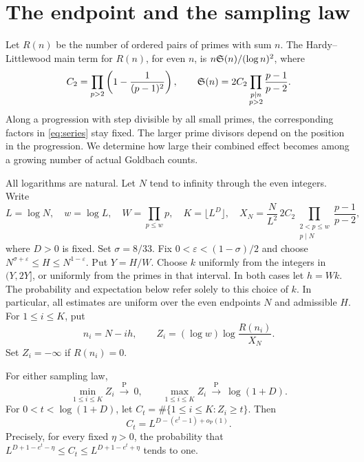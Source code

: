\section{The endpoint and the sampling law}

Let \(R(n)\) be the number of ordered pairs of primes with sum \(n\). The
Hardy--Littlewood main term for \(R(n)\), for even \(n\), is
\(n\mathfrak S(n)/(\log n)^2\), where
\begin{equation}\label{eq:series}
 C_2=\prod_{p>2}\left(1-\frac{1}{(p-1)^2}\right),\qquad
 \mathfrak S(n)=2C_2\prod_{\substack{p\mid n\\p>2}}\frac{p-1}{p-2}.
\end{equation}
Along a progression with step divisible by all small primes,
the corresponding factors in \eqref{eq:series} stay fixed. The larger
prime divisors depend on the position in the progression. We determine
how large their combined effect becomes among a growing number of actual
Goldbach counts.

All logarithms are natural. Let \(N\) tend to infinity through the even
integers. Write
\begin{equation}\label{eq:parameters}
 L=\log N,\quad w=\log L,\quad W=\prod_{p\le w}p,\quad
 K=\lfloor L^D\rfloor,\quad
 X_N=\frac{N}{L^2}\,2C_2\prod_{\substack{2<p\le w\\p\mid N}}
                                 \frac{p-1}{p-2},
\end{equation}
where \(D>0\) is fixed. Set \(\sigma=8/33\). Fix
\(0<\varepsilon<(1-\sigma)/2\) and choose
\(N^{\sigma+\varepsilon}\le H\le N^{1-\varepsilon}\). Put \(Y=H/W\).
Choose \(k\) uniformly from the integers in \((Y,2Y]\), or uniformly
from the primes in that interval. In both cases let \(h=Wk\). The
probability and expectation below refer solely to this choice of \(k\).
In particular, all estimates are uniform over the even endpoints \(N\)
and admissible \(H\). For \(1\le i\le K\), put
\[
 n_i=N-ih,\qquad Z_i=(\log w)\log\frac{R(n_i)}{X_N}.
\]
Set \(Z_i=-\infty\) if \(R(n_i)=0\).

\begin{theorem}\label{thm:main}
For either sampling law,
\[
  \min_{1\le i\le K}Z_i \ \xrightarrow{\ \mathrm{P}\ }\ 0,
  \qquad
  \max_{1\le i\le K}Z_i \ \xrightarrow{\ \mathrm{P}\ }\ \log(1+D).
\]
For \(0<t<\log(1+D)\), let \(C_t=\#\{1\le i\le K:Z_i\ge t\}\).
Then
\begin{equation}\label{eq:profile}
        C_t=L^{D-(e^t-1)+o_{\mathrm P}(1)} .
\end{equation}
Precisely, for every fixed \(\eta>0\), the probability that
\(L^{D+1-e^t-\eta}\le C_t\le L^{D+1-e^t+\eta}\) tends to one.
\end{theorem}

